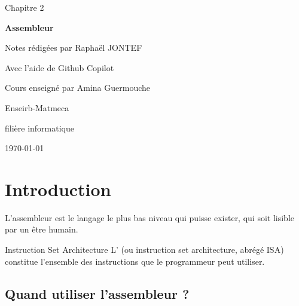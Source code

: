 

\newcommand{\titrechapitre}{Assembleur}
\newcommand{\numerochapitre}{2}

\renewcommand{\headrulewidth}{0.4pt}
\renewcommand{\footrulewidth}{0.4pt}
\fancyfoot[C]{\thepage}
\fancyhead[R]{\titrechapitre}




\setlength{\headheight}{15pt}
\begin{titlepage}
    \centering
    \vspace*{3cm}
    {\huge Chapitre \numerochapitre\par}
    {\Huge \bfseries\titrechapitre\par}
    \vspace{2cm}
    {\Large Notes rédigées par Raphaël JONTEF\par}
{\Large Avec l'aide de Github Copilot\par}
    \vspace{0.5cm}
    {\normalsize Cours enseigné par Amina Guermouche\par}
    \vspace{4cm}
    {\small Enseirb-Matmeca\par}
    {\small filière informatique\par}
    \vfill
    {\large \today\par}
\end{titlepage}

\tableofcontents
\newpage



\section{Introduction}

L'assembleur est le langage le plus bas niveau qui puisse exister, qui soit lisible par un être humain. 

\begin{definition}{}{Instruction Set Architecture}
    L' (ou instruction set architecture, abrégé ISA) constitue l'ensemble des instructions que le programmeur peut utiliser.
\end{definition}

\subsection{Quand utiliser l'assembleur ?}

